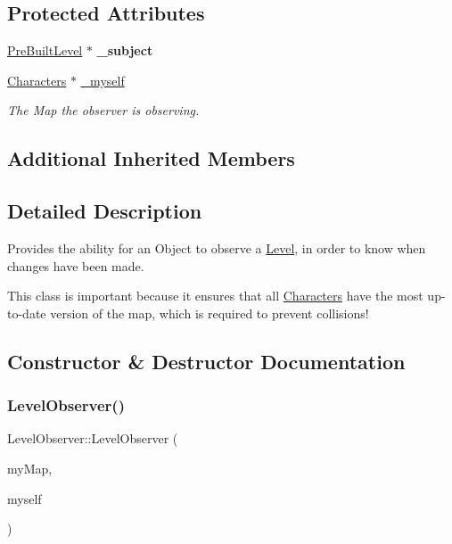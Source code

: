 \subsection*{Protected Attributes}
\begin{DoxyCompactItemize}
\item 
\hypertarget{class_level_observer_ab150621378f03c4b4ad976fa190eb567}{}\label{class_level_observer_ab150621378f03c4b4ad976fa190eb567} 
\hyperlink{class_pre_built_level}{Pre\+Built\+Level} $\ast$ {\bfseries \+\_\+subject}
\item 
\hypertarget{class_level_observer_af684808fe42ea6cf2e6b113590208d7e}{}\label{class_level_observer_af684808fe42ea6cf2e6b113590208d7e} 
\hyperlink{class_characters}{Characters} $\ast$ \hyperlink{class_level_observer_af684808fe42ea6cf2e6b113590208d7e}{\+\_\+myself}
\begin{DoxyCompactList}\small\item\em The Map the observer is observing. \end{DoxyCompactList}\end{DoxyCompactItemize}
\subsection*{Additional Inherited Members}


\subsection{Detailed Description}
Provides the ability for an Object to observe a \hyperlink{class_level}{Level}, in order to know when changes have been made. 

This class is important because it ensures that all \hyperlink{class_characters}{Characters} have the most up-\/to-\/date version of the map, which is required to prevent collisions! 

\subsection{Constructor \& Destructor Documentation}
\hypertarget{class_level_observer_a89ab0b90a4d29dbfa3527d37e83824c0}{}\label{class_level_observer_a89ab0b90a4d29dbfa3527d37e83824c0} 
\subsubsection{\texorpdfstring{Level\+Observer()}{LevelObserver()}}
{\footnotesize\ttfamily Level\+Observer\+::\+Level\+Observer (\begin{DoxyParamCaption}\item[{\hyperlink{class_pre_built_level}{Pre\+Built\+Level} $\ast$}]{my\+Map,  }\item[{\hyperlink{class_characters}{Characters} $\ast$}]{myself }\end{DoxyParamCaption})}

